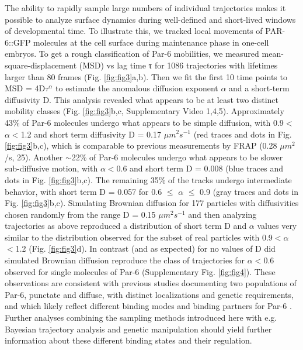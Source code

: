  The ability to rapidly sample large numbers of individual trajectories makes it possible to analyze surface dynamics during well-defined and short-lived windows of developmental time. To illustrate this, we tracked local movements of PAR-6::GFP molecules at the cell surface during maintenance phase in one-cell embryos. To get a rough classification of Par-6 mobilities, we measured mean-square-displacement (MSD) vs lag time τ for 1086 trajectories with lifetimes larger than 80 frames (Fig. \ref{fig:fig3}a,b). Then we fit the first 10 time points to MSD = 4D$\tau^\alpha$ to estimate the anomalous diffusion exponent $\alpha$ and a short-term diffusivity D. This analysis revealed what appears to be at least two distinct mobility classes (Fig. \ref{fig:fig3}b,c, Supplementary Video 1,4,5). Approximately 43\% of Par-6 molecules undergo what appears to be simple diffusion, with 0.9$<$$\alpha$$<$1.2 and short term diffusivity D = 0.17 $\mu$$m^2$$s^{-1}$ (red traces and dots in Fig. \ref{fig:fig3}b,c), which is comparable to previous measurements by FRAP (0.28 $\mu$$m^2$/s, 25). Another $\sim$22\% of Par-6 molecules undergo what appears to be slower sub-diffusive motion, with $\alpha$$<$0.6 and short term D = 0.008 (blue traces and dots in Fig. \ref{fig:fig3}b,c). The remaining 35\% of the tracks undergo intermediate behavior, with short term D = 0.057 for 0.6 $≤$ $\alpha$ $≤$ 0.9 (gray traces and dots in Fig. \ref{fig:fig3}b,c). Simulating Brownian diffusion for 177 particles with diffusivities chosen randomly from the range D = 0.15 $\mu$$m^2$$s^{-1}$ and then analyzing trajectories as above reproduced a distribution of short term D and $\alpha$ values very similar to the distribution observed for the subset of real particles with 0.9$<$$\alpha$$<$1.2 (Fig. \ref{fig:fig3}d). In contrast (and as expected) for no values of D did simulated Brownian diffusion reproduce the class of trajectories for $\alpha$$<$0.6 observed for single molecules of Par-6 (Supplementary Fig. \ref{fig:fig4}). These observations are consistent with previous studies documenting two populations of Par-6, punctate and diffuse, with distinct localizations and genetic requirements, and which likely reflect different binding modes and binding partners for Par-6 \cite{nmeth22}. Further analyses combining the sampling methods introduced here with e.g. Bayesian trajectory analysis \cite{nmeth28,nmeth29} and genetic manipulation should yield further information about these different binding states and their regulation.
 
